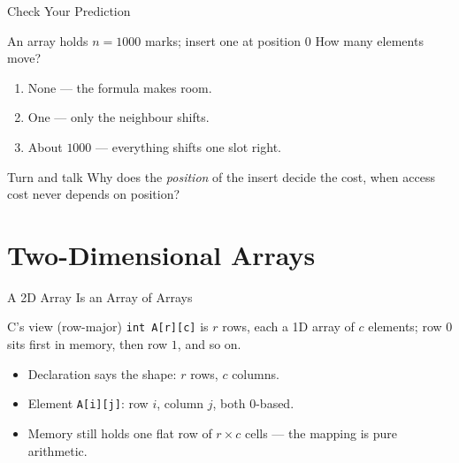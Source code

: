 \documentclass[aspectratio=169]{beamer}
\begin{document}
\begin{frame}{Check Your Prediction}
  \begin{block}{An array holds $n = 1000$ marks; insert one at position $0$}
    How many elements move?
  \end{block}
  \begin{enumerate}
    \item None --- the formula makes room.
    \item One --- only the neighbour shifts.
    \item About $1000$ --- everything shifts one slot right.
  \end{enumerate}
  \begin{exampleblock}{Turn and talk}
    Why does the \emph{position} of the insert decide the cost, when access
    cost never depends on position?
  \end{exampleblock}
\end{frame}


\section{Two-Dimensional Arrays}


\begin{frame}{A 2D Array Is an Array of Arrays}
  \begin{block}{C's view (row-major)}
    \texttt{int A[r][c]} is $r$ rows, each a 1D array of $c$ elements; row
    $0$ sits first in memory, then row $1$, and so on.
  \end{block}
  \begin{itemize}
    \item Declaration says the shape: $r$ rows, $c$ columns.
    \item Element \texttt{A[i][j]}: row $i$, column $j$, both 0-based.
    \item Memory still holds one flat row of $r \times c$ cells --- the
      mapping is pure arithmetic.
  \end{itemize}
\end{frame}
\end{document}
